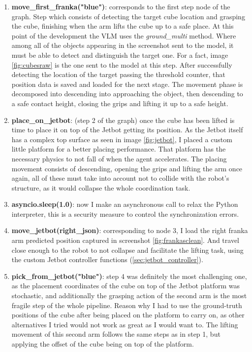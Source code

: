 \begin{enumerate}
	\item \textbf{move\_first\_franka("blue")}: corresponds to the first step node of the graph. Step which consists of detecting the target cube location and grasping the cube, finishing when the arm lifts the cube up to a safe place. At this point of the development the VLM uses the \textit{ground\_multi} method. Where among all of the objects appearing in the screenshot sent to the model, it must be able to detect and distinguish the target one. For a fact, image \ref{fig:cubesraw} is the one sent to the model at this step. After successfully detecting the location of the target passing the threshold counter, that position data is saved and loaded for the next stage. The movement phase is decomposed into descending into approaching the object, then descending to a safe contact height, closing the grips and lifting it up to a safe height.
	
	\item \textbf{place\_on\_jetbot}: (step 2 of the graph) once the cube has been lifted is time to place it on top of the Jetbot getting its position. As the Jetbot itself has a complex top surface as seen in image \ref{fig:jetbot}, I placed a custom little platform for a better placing performance. That platform has the necessary physics to not fall of when the agent accelerates. The placing movement consists of descending, opening the grips and lifting the arm once again, all of these must take into account not to collide with the robot's structure, as it would collapse the whole coordination task.  
	
	\item \textbf{asyncio.sleep(1.0)}: now I make an asynchronous call to relax the Python interpreter, this is a security measure to control the synchronization errors. 
	
	\item \textbf{move\_jetbot(right\_json)}: corresponding to node 3, I load the right franka arm predicted position captured in screenshot \ref{fig:frankasclean}. And travel close enough to the robot to not collapse and facilitate the lifting task, using the custom Jetbot controller functions (\ref{sec:jetbot_controller}).
	
	\item \textbf{pick\_from\_jetbot("blue")}: step 4 was definitely the most challenging one, as the placement coordinates of the cube on top of the Jetbot platform was stochastic, and additionally the grasping action of the second arm is the most fragile step of the whole pipeline. Reason why I had to use the ground-truth positions of the cube after being placed on the platform to carry on, as other alternatives I tried would not work as great as I would want to. The lifting movement of this second arm follows the same steps as in step 1, but applying the offset of the cube being on top of the platform.  
	

\end{enumerate}

